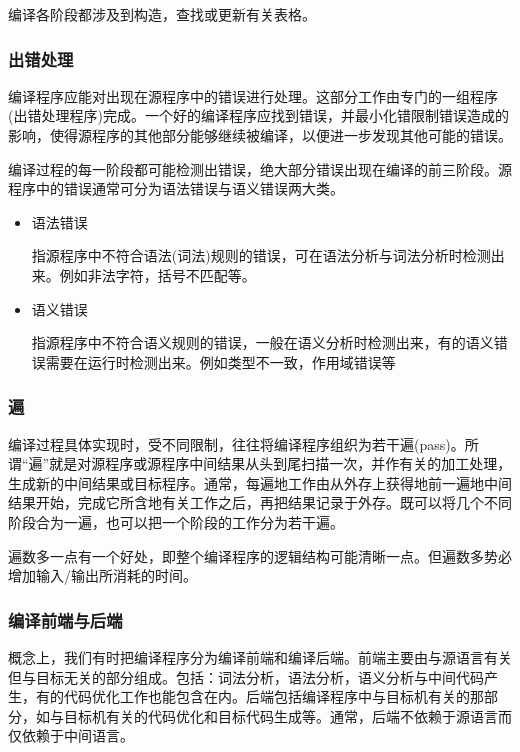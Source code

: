 编译各阶段都涉及到构造，查找或更新有关表格。

\subsubsection{出错处理}

编译程序应能对出现在源程序中的错误进行处理。这部分工作由专门的一组程序(出错处理程序)完成。一个好的编译程序应找到错误，并最小化错限制错误造成的影响，使得源程序的其他部分能够继续被编译，以便进一步发现其他可能的错误。

编译过程的每一阶段都可能检测出错误，绝大部分错误出现在编译的前三阶段。源程序中的错误通常可分为语法错误与语义错误两大类。

\begin{itemize}
    \item 语法错误 
    
    指源程序中不符合语法(词法)规则的错误，可在语法分析与词法分析时检测出来。例如非法字符，括号不匹配等。
    \item 语义错误
    
    指源程序中不符合语义规则的错误，一般在语义分析时检测出来，有的语义错误需要在运行时检测出来。例如类型不一致，作用域错误等
\end{itemize}

\subsubsection{遍}

编译过程具体实现时，受不同限制，往往将编译程序组织为若干遍(pass)。所谓``遍''就是对源程序或源程序中间结果从头到尾扫描一次，并作有关的加工处理，生成新的中间结果或目标程序。通常，每遍地工作由从外存上获得地前一遍地中间结果开始，完成它所含地有关工作之后，再把结果记录于外存。既可以将几个不同阶段合为一遍，也可以把一个阶段的工作分为若干遍。

遍数多一点有一个好处，即整个编译程序的逻辑结构可能清晰一点。但遍数多势必增加输入/输出所消耗的时间。

\subsubsection{编译前端与后端}

概念上，我们有时把编译程序分为编译前端和编译后端。前端主要由与源语言有关但与目标无关的部分组成。包括：\textcolor{tip}{词法分析，语法分析，语义分析与中间代码产生，有的代码优化工作也能包含在内。}后端包括编译程序中与目标机有关的那部分，如与目标机有关的\textcolor{tip}{代码优化和目标代码生成等。}通常，\textcolor{tip}{后端不依赖于源语言而仅依赖于中间语言。}

